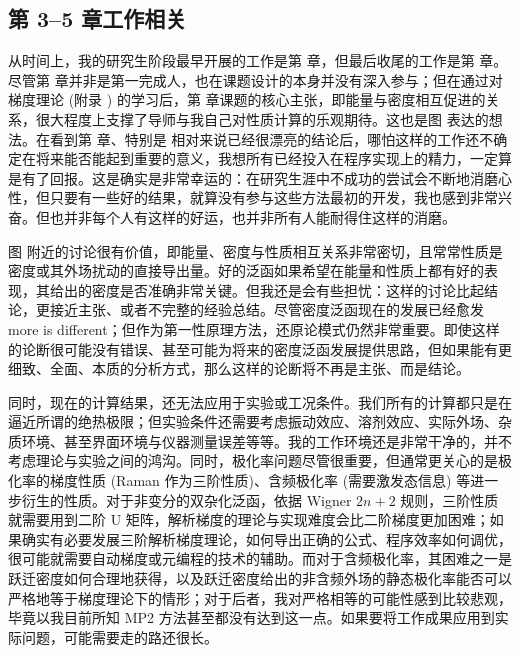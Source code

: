 \subsection*{第 3--5 章工作相关}

从时间上，我的研究生阶段最早开展的工作是第  章，但最后收尾的工作是第  章。尽管第  章并非是第一完成人，也在课题设计的本身并没有深入参与；但在通过对梯度理论 (附录 ) 的学习后，第  章课题的核心主张，即能量与密度相互促进的关系，很大程度上支撑了导师与我自己对性质计算的乐观期待。这也是图  表达的想法。在看到第  章、特别是  相对来说已经很漂亮的结论后，哪怕这样的工作还不确定在将来能否能起到重要的意义，我想所有已经投入在程序实现上的精力，一定算是有了回报。这是确实是非常幸运的：在研究生涯中不成功的尝试会不断地消磨心性，但只要有一些好的结果，就算没有参与这些方法最初的开发，我也感到非常兴奋。但也并非每个人有这样的好运，也并非所有人能耐得住这样的消磨。

图  附近的讨论很有价值，即能量、密度与性质相互关系非常密切，且常常性质是密度或其外场扰动的直接导出量。好的泛函如果希望在能量和性质上都有好的表现，其给出的密度是否准确非常关键。但我还是会有些担忧：这样的讨论比起结论，更接近主张、或者不完整的经验总结。尽管密度泛函现在的发展已经愈发 more is different\cite{Anderson-Anderson.S.1972}；但作为第一性原理方法，还原论模式仍然非常重要。即使这样的论断很可能没有错误、甚至可能为将来的密度泛函发展提供思路，但如果能有更细致、全面、本质的分析方式，那么这样的论断将不再是主张、而是结论。

同时，现在的计算结果，还无法应用于实验或工况条件。我们所有的计算都只是在逼近所谓的绝热极限；但实验条件还需要考虑振动效应、溶剂效应、实际外场、杂质环境、甚至界面环境与仪器测量误差等等\cite{Mata-Suhm.ACIE.2017, Varandas-Varandas.ARPC.2018}。我的工作环境还是非常干净的，并不考虑理论与实验之间的鸿沟。同时，极化率问题尽管很重要，但通常更关心的是极化率的梯度性质 (Raman 作为三阶性质)、含频极化率 (需要激发态信息) 等进一步衍生的性质。对于非变分的双杂化泛函，依据 Wigner $2n+2$ 规则，三阶性质就需要用到二阶 U 矩阵，解析梯度的理论与实现难度会比二阶梯度更加困难；如果确实有必要发展三阶解析梯度理论，如何导出正确的公式、程序效率如何调优，很可能就需要自动梯度或元编程的技术的辅助。而对于含频极化率，其困难之一是跃迁密度如何合理地获得，以及跃迁密度给出的非含频外场的静态极化率能否可以严格地等于梯度理论下的情形；对于后者，我对严格相等的可能性感到比较悲观，毕竟以我目前所知 MP2 方法甚至都没有达到这一点。如果要将工作成果应用到实际问题，可能需要走的路还很长。
